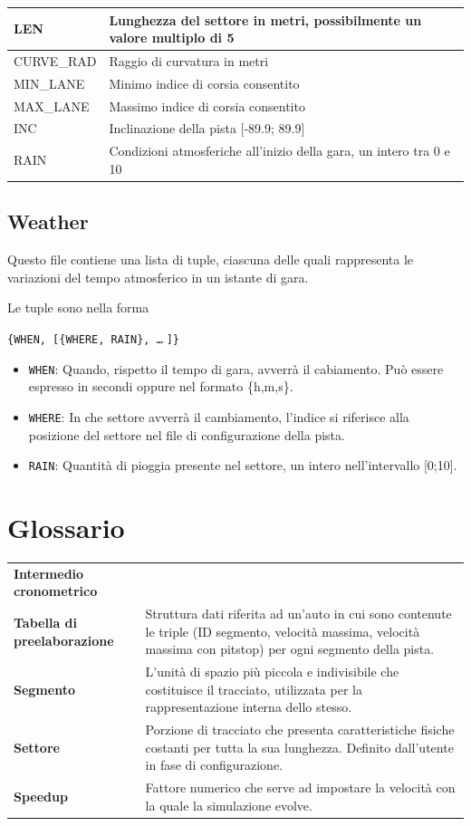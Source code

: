 \documentclass[11pt,a4paper]{report}
\newcommand{\term}[2]{\textbf{#1} & #2 \\}
\begin{document}
\begin{center}
\begin{tabular}{|p{}|p{}|}
\hline
LEN & Lunghezza del settore in metri, possibilmente un valore multiplo di 5\\
\hline
CURVE\_RAD & Raggio di curvatura in metri\\
\hline
MIN\_LANE & Minimo indice di corsia consentito\\
\hline
MAX\_LANE & Massimo indice di corsia consentito\\
\hline
INC & Inclinazione della pista [-89.9; 89.9]\\
\hline
RAIN & Condizioni atmosferiche all'inizio della gara, un intero tra 0 e 10\\
\hline
\end{tabular}
\end{center}

\section*{Weather}
Questo file contiene una lista di tuple, ciascuna delle quali rappresenta le variazioni del tempo atmosferico in un istante di gara.

Le tuple sono nella forma
\begin{center}
\texttt{\{WHEN, [\{WHERE, RAIN\}, \dots $\;$]\}}
\end{center}
\begin{itemize}
\item \texttt{WHEN}: Quando, rispetto il tempo di gara, avverrà il cabiamento. Può essere espresso in secondi oppure nel formato \{h,m,s\}.
\item \texttt{WHERE}: In che settore avverrà il cambiamento, l'indice si riferisce alla posizione del settore nel file di configurazione della pista.
\item \texttt{RAIN}: Quantità di pioggia presente nel settore, un intero nell'intervallo [0;10].
\end{itemize}


\chapter{Glossario}

\begin{tabularx}{\textwidth}{lX}
\term{Intermedio cronometrico}{}
\term{Tabella di preelaborazione}{Struttura dati riferita ad un'auto in cui sono contenute le triple (ID segmento, velocità massima, velocità massima con pitstop) per ogni segmento della pista.}
\term{Segmento}{L'unità di spazio più piccola e indivisibile che costituisce il tracciato, utilizzata per la rappresentazione interna dello stesso.}
\term{Settore}{Porzione di tracciato che presenta caratteristiche fisiche costanti per tutta la sua lunghezza. Definito dall'utente in fase di configurazione.}
\term{Speedup}{Fattore numerico che serve ad impostare la velocità con la quale la simulazione evolve.}
\end{tabularx}
\end{document}
